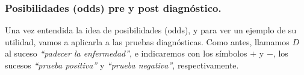 %
%
%
%

\subsubsection*{Posibilidades (odds) pre y post diagnóstico.}

Una vez entendida la idea de posibilidades (odds), y para ver un ejemplo de su utilidad, vamos a aplicarla a las pruebas diagnósticas.  Como antes, llamamos $D$ al suceso {\em ``padecer la enfermedad''}, e indicaremos con los símbolos $+$ y $-$, los sucesos {\em ``prueba positiva''} y {\em ``prueba negativa''}, respectivamente.

